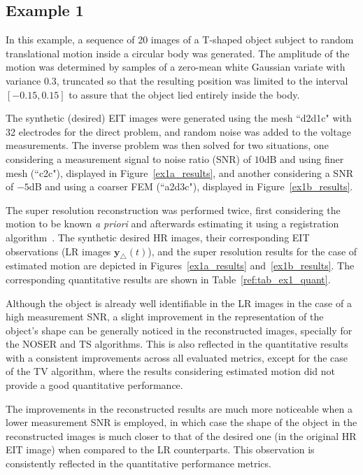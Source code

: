 \documentclass[10pt]{IEEEtran}
\newcommand{\vy}{\mathbf{y}}
\begin{document}
\subsection{Example 1}

In this example, a sequence of 20 images of a T-shaped object subject to random translational motion inside a circular body was generated.
%
The amplitude of the motion was determined by samples of a zero-mean white Gaussian variate with variance $0.3$, truncated so that  the resulting position was limited to the interval $[-0.15,0.15]$ to assure that the object lied entirely inside the body.


The synthetic (desired) EIT images were generated using the mesh ``d2d1c" with 32 electrodes for the direct problem, and random noise was added to the voltage measurements.
%
The inverse problem was then solved for two situations, one considering a measurement signal to noise ratio (SNR) of $10$dB and using finer mesh (``c2c"), displayed in Figure~\ref{ex1a_results}, and another considering a SNR of $-5$dB and using a coarser FEM (``a2d3c"),  displayed in Figure~\ref{ex1b_results}.


The super resolution reconstruction was performed twice, first considering the motion to be known \textit{a priori} and afterwards estimating it using a registration algorithm~\cite{Sun10}.
%
The synthetic desired HR images, their corresponding EIT observations (LR images $\vy_{\triangle}(t)$), and the super resolution results for the case of estimated motion are depicted in Figures~\ref{ex1a_results} and~\ref{ex1b_results}.
%
The corresponding quantitative results are shown in Table~\ref{ref:tab_ex1_quant}.



Although the object is already well identifiable in the LR images in the case of a high measurement SNR, a slight improvement in the representation of the object's shape can be  generally noticed in the reconstructed images, specially for the NOSER and TS algorithms.
%
This is also reflected in the quantitative results with a consistent improvements across all evaluated metrics, except for the case of the TV algorithm, where the results considering estimated motion did not provide a good quantitative performance.




The improvements in the reconstructed results are much more noticeable when a lower measurement SNR is employed, in which case the shape of the object in the reconstructed images is much closer to that of the desired one (in the original HR EIT image) when compared to the LR counterparts.
%
This observation is consistently reflected in the quantitative performance metrics.
\end{document}
